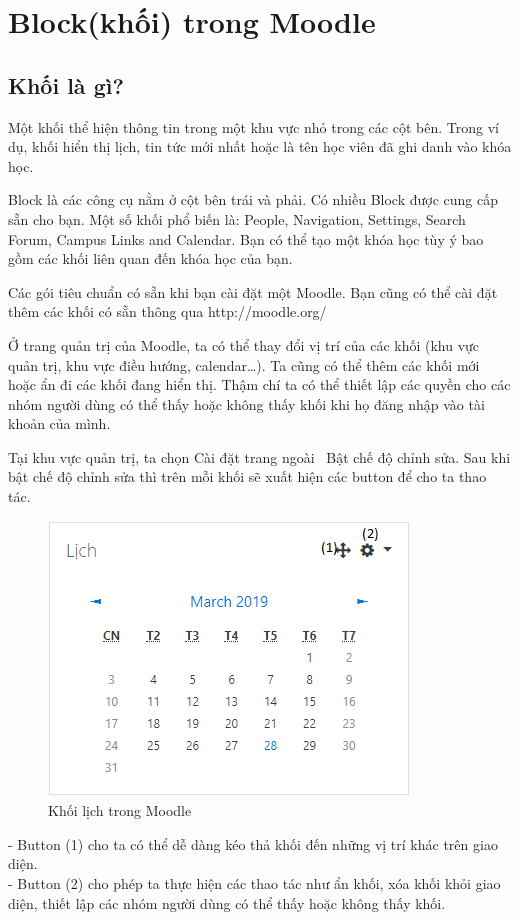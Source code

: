\section{Block(khối) trong Moodle}
\subsection{Khối là gì?}
Một khối thể hiện thông tin trong một khu vực nhỏ trong các cột bên. Trong ví dụ, khối hiển thị lịch, tin tức mới nhất hoặc là tên học viên đã ghi danh vào khóa học.

Block là các công cụ nằm ở cột bên trái và phải. Có nhiều Block được cung cấp sẵn cho bạn. Một số khối phổ biến là: People, Navigation, Settings, Search Forum, Campus Links and Calendar. Bạn có thể tạo một khóa học tùy ý bao gồm các khối liên quan đến khóa học của bạn. \cite{blockmoodle}

Các gói tiêu chuẩn có sẵn khi bạn cài đặt một Moodle. Bạn cũng có thể cài đặt thêm các khối có sẵn thông qua http://moodle.org/

Ở trang quản trị của Moodle, ta có thể thay đổi vị trí của các khối (khu vực quản trị, khu vực điều hướng, calendar…). Ta cũng có thể thêm các khối mới hoặc ẩn đi các khối đang hiển thị. Thậm chí ta có thể thiết lập các quyền cho các nhóm người dùng có thể thấy hoặc không thấy khối khi họ đăng nhập vào tài khoản của mình.

Tại khu vực quản trị, ta chọn Cài đặt trang ngoài \ Bật chế độ chỉnh sửa. Sau khi bật chế độ chỉnh sửa thì trên mỗi khối sẽ xuất hiện các button để cho ta thao tác.
\begin{center}
	\begin{figure}[htp]
		\begin{center}
			\includegraphics[scale=1]{img/lich}
		\end{center}
		\caption{Khối lịch trong Moodle}
		\label{refhinh2}
	\end{figure}
\end{center}
- Button (1) cho ta có thể dễ dàng kéo thả khối đến những vị trí khác trên giao diện.\\
- Button (2) cho phép ta thực hiện các thao tác như ẩn khối, xóa khối khỏi giao diện, thiết lập các nhóm người dùng có thể thấy hoặc không thấy khối.

